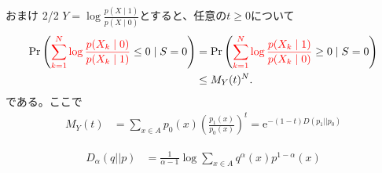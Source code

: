 \documentclass[lualatex,handout]{beamer}
\newcommand{\mycolor}[2]{%
  \begingroup
  \colorlet{currentcolor}{.}%
  \color{#1}#2%
  \color{currentcolor}%
  \endgroup
}
\newcommand{\emm}[1]{\mycolor{red}{#1}}
\theoremstyle{definition}
\begin{document}
\begin{frame}{おまけ 2/2}
$Y=\log\frac{p(X\mid 1)}{p(X\mid 0)}$とすると、任意の$t\ge 0$について
\begin{align*}
\Pr\left(\emm{\sum_{k=1}^N \log\frac{p(X_k\mid 0)}{p(X_k\mid 1)}} \le 0\mid S=0\right)
&=\Pr\left(\emm{\sum_{k=1}^N \log\frac{p(X_k\mid 1)}{p(X_k\mid 0)}} \ge 0\mid S=0\right)\\
&\le M_Y(t)^N.
\end{align*}
である。ここで
\begin{align*}
M_Y(t) &= \sum_{x\in A} p_0(x) \left(\frac{p_1(x)}{p_0(x)}\right)^t = \mathrm{e}^{-(1-t)D(p_1||p_0)}
\end{align*}
\begin{definition}
\begin{align*}
D_\alpha(q||p) &= \frac1{\alpha - 1} \log \sum_{x\in A} q^\alpha(x) p^{1-\alpha}(x)
\end{align*}
\end{definition}
\end{frame}
\fi
\end{document}
